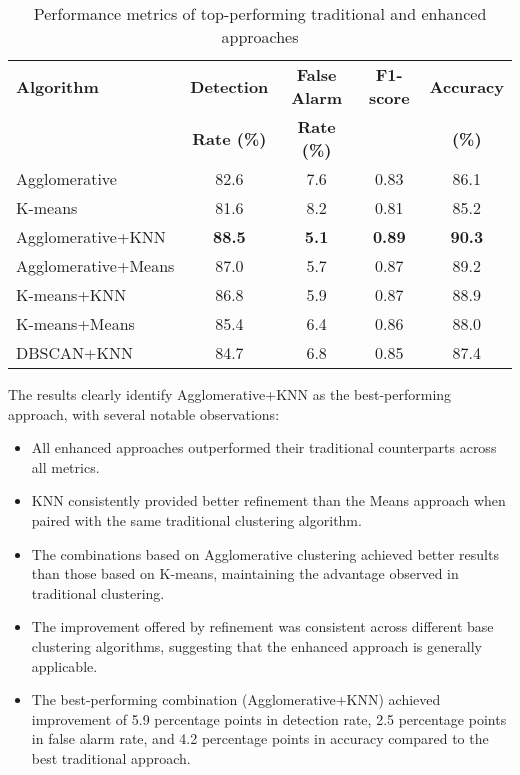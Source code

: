 \begin{table}[htbp]
    \centering
    \caption{Performance metrics of top-performing traditional and enhanced approaches}
    \label{tab:enhanced_performance}
    \begin{tabular}{lcccc}
        \toprule
        \textbf{Algorithm} & \textbf{Detection} & \textbf{False Alarm} & \textbf{F1-score} & \textbf{Accuracy} \\
        & \textbf{Rate (\%)} & \textbf{Rate (\%)} & & \textbf{(\%)} \\
        \midrule
        Agglomerative & 82.6 & 7.6 & 0.83 & 86.1 \\
        K-means & 81.6 & 8.2 & 0.81 & 85.2 \\
        \midrule
        Agglomerative+KNN & \textbf{88.5} & \textbf{5.1} & \textbf{0.89} & \textbf{90.3} \\
        Agglomerative+Means & 87.0 & 5.7 & 0.87 & 89.2 \\
        K-means+KNN & 86.8 & 5.9 & 0.87 & 88.9 \\
        K-means+Means & 85.4 & 6.4 & 0.86 & 88.0 \\
        DBSCAN+KNN & 84.7 & 6.8 & 0.85 & 87.4 \\
        \bottomrule
    \end{tabular}
\end{table}

The results clearly identify Agglomerative+KNN as the best-performing approach, with several notable observations:

\begin{itemize}
    \item All enhanced approaches outperformed their traditional counterparts across all metrics.
    
    \item KNN consistently provided better refinement than the Means approach when paired with the same traditional clustering algorithm.
    
    \item The combinations based on Agglomerative clustering achieved better results than those based on K-means, maintaining the advantage observed in traditional clustering.
    
    \item The improvement offered by refinement was consistent across different base clustering algorithms, suggesting that the enhanced approach is generally applicable.
    
    \item The best-performing combination (Agglomerative+KNN) achieved improvement of 5.9 percentage points in detection rate, 2.5 percentage points in false alarm rate, and 4.2 percentage points in accuracy compared to the best traditional approach.
\end{itemize}

